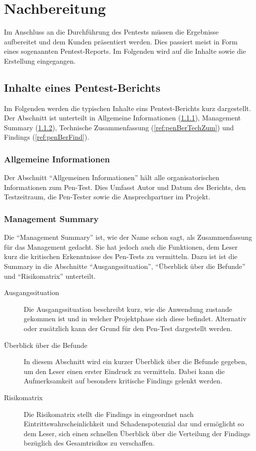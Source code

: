 \section{Nachbereitung}
Im Anschluss an die Durchführung des Pentests müssen die Ergebnisse aufbereitet und dem Kunden präsentiert werden. Dies passiert meist in Form eines sogenannten Pentest-Reports. Im Folgenden wird auf die Inhalte sowie die Erstellung eingegangen.

	\subsection{Inhalte eines Pentest-Berichts}
	Im Folgenden werden die typischen Inhalte eins Pentest-Berichts kurz dargestellt. Der Abschnitt ist unterteilt in Allgemeine Informationen (\ref{ref:penBerAllgInf}), Management Summary (\ref{ref:penBerMgmtSum}), Technische Zusammenfassung (\ref{ref:penBerTechZum}) und Findings (\ref{ref:penBerFind}).
	\subsubsection{Allgemeine Informationen}\label{ref:penBerAllgInf}
		Der Abschnitt "`Allgemeinen Informationen"' hält alle organisatorischen Informationen zum Pen-Test. Dies Umfasst Autor und Datum des Berichts, den Testzeitraum, die Pen-Tester sowie die  Ansprechpartner im Projekt.
		
	\subsubsection{Management Summary}\label{ref:penBerMgmtSum}
	Die "`Management Summary"' ist, wie der Name schon sagt, als Zusammenfassung für das Management gedacht. Sie hat jedoch auch die Funktionen, dem Leser kurz die kritischen Erkenntnisse des Pen-Tests zu vermitteln. Dazu ist ist die Summary in die Abschnitte "`Ausgangssituation"', "`Überblick über die Befunde"' und "`Risikomatrix"' unterteilt.
	
	\begin{description}
		\item[Ausgangssituation] Die Ausgangssituation beschreibt kurz, wie die Anwendung zustande gekommen ist und in welcher Projektphase sich diese befindet. Alternativ oder zusätzlich kann der Grund für den Pen-Test dargestellt werden. 
		\item[Überblick über die Befunde] In diesem Abschnitt wird ein kurzer Überblick über die Befunde gegeben, um den Leser einen erster Eindruck zu vermitteln.	Dabei kann die Aufmerksamkeit auf besonders kritische Findings gelenkt werden.
		\item[Risikomatrix] Die Risikomatrix stellt die Findings in eingeordnet nach Eintrittswahrscheinlichkeit und Schadenspotenzial dar und ermöglicht so dem Leser, sich einen schnellen Überblick über die Verteilung der Findings bezüglich des Gesamtrisikos zu verschaffen.
	\end{description}
		
